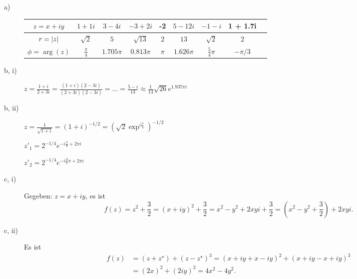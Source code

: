 \begin{description}
	\item[a)] 
	\begin{tabular}{|c||c|c|c|c|c|c|c|c|}
		\hline 
		$z = x + iy$ & $1 + 1i$ & $3 - 4i$ & $-3 + 2i$ & -2 & $5 - 12 i$ & $-1 - i$ & 1 + 1.7i \\
		\hline
		$r = \left\lvert z \right\rvert$ & $\sqrt{2}$ & $5$ & $\sqrt{13}$ & $2$ & $13$ & $\sqrt{2}$ & 2 \\
		\hline 
		$\phi = \arg(z)$ & $\frac{\pi}{4}$ & $1.705 \pi$ & $0.813 \pi$ & $\pi$ & $1.626 \pi$ & $\frac{5}{4} \pi$ & $-\pi/3$ \\
		\hline 
	\end{tabular}
 
	\item[b, i)] $z = \frac{1 + i}{2 + 3i} = \frac{(1 + i)(2 - 3i)}{(2 + 3i)(2 - 3i)} = \dots = \frac{5 - i}{13} \approx \frac{1}{13} \sqrt{26} e^{1.937 \pi i}$
	
	\item[b, ii)] $z = \frac{1}{\sqrt{1 + i}} = (1 + i)^{-1/2} = \left( \sqrt{2}\exp^{i \frac{\pi}{4}} \right)^{-1/2}$
	
		$z'_1 = 2^{-1/4} e^{-i \frac{\pi}{8} + 2 \pi i}$
		
		$z'_2 = 2^{-1/4} e^{-i \frac{9}{8} \pi + 2 \pi i}$
		
	\item[c, i)] Gegeben: $z = x + i y$, es ist 
	\[
		f(z) = z^2 + \frac{3}{2} = (x + iy)^2 + \frac{3}{2} = x^2 - y^2 + 2xyi + \frac{3}{2} = \left( x^2 - y^2 + \frac{3}{2} \right) + 2xyi
		\text{.}
	\]
	
	\item[c, ii)] Es ist
	\begin{align*}
		f(z) &= (z + z^\star) + (z - z^\star)^3 = (x + iy + x - iy)^2 + (x + iy - x + iy)^3 \\
		&= (2x)^2 + (2iy)^2 = 4x^2 - 4y^2
		\text{.}
	\end{align*}
\end{description}


